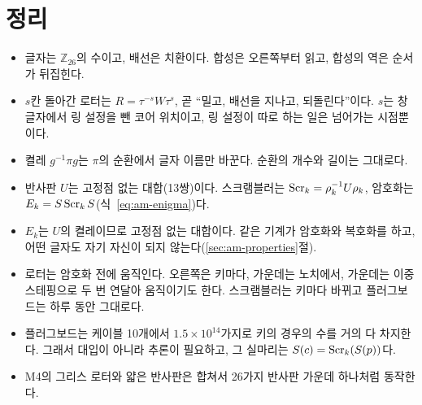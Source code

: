 \section{정리}

\begin{itemize}
\item 글자는 $\mathbb{Z}_{26}$의 수이고, 배선은 치환이다. 합성은 오른쪽부터 읽고, 합성의 역은 순서가 뒤집힌다.
\item $s$칸 돌아간 로터는 $R = \tau^{-s}W\tau^{s}$, 곧 ``밀고, 배선을 지나고, 되돌린다''이다. $s$는 창 글자에서 링
설정을 뺀 코어 위치이고, 링 설정이 따로 하는 일은 넘어가는 시점뿐이다.
\item 켤레 $g^{-1}\pi g$는 $\pi$의 순환에서 글자 이름만 바꾼다. 순환의 개수와 길이는 그대로다.
\item 반사판 $U$는 고정점 없는 대합(13쌍)이다. 스크램블러는 $\mathrm{Scr}_k = \rho_k^{-1}U\rho_k$, 암호화는
$E_k = S\,\mathrm{Scr}_k\,S$(식~\eqref{eq:am-enigma})다.
\item $E_k$는 $U$의 켤레이므로 고정점 없는 대합이다. 같은 기계가 암호화와 복호화를 하고, 어떤 글자도 자기 자신이
되지 않는다(\ref{sec:am-properties}절).
\item 로터는 암호화 전에 움직인다. 오른쪽은 키마다, 가운데는 노치에서, 가운데는 이중 스테핑으로 두 번 연달아
움직이기도 한다. 스크램블러는 키마다 바뀌고 플러그보드는 하루 동안 그대로다.
\item 플러그보드는 케이블 10개에서 $1.5 \times 10^{14}$가지로 키의 경우의 수를 거의 다 차지한다. 그래서 대입이 아니라
추론이 필요하고, 그 실마리는 $S(c) = \mathrm{Scr}_k(S(p))$다.
\item M4의 그리스 로터와 얇은 반사판은 합쳐서 26가지 반사판 가운데 하나처럼 동작한다.
\end{itemize}
